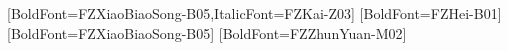 \usepackage{xeCJK}
[BoldFont=FZXiaoBiaoSong-B05,ItalicFont=FZKai-Z03]
[BoldFont=FZHei-B01]
[BoldFont=FZXiaoBiaoSong-B05]
[BoldFont=FZZhunYuan-M02]

\allowdisplaybreaks{}

\newcommand{\isFullBook}[2]{
  \ifnum\pdfstrcmp{\FullBook}{True}=0
    \ifnum\pdfstrcmp{}{#1}=0\unskip\else#1\fi
  \else
    \ifnum\pdfstrcmp{}{#2}=0\unskip\else#2\fi
  \fi\ignorespaces{}
}
